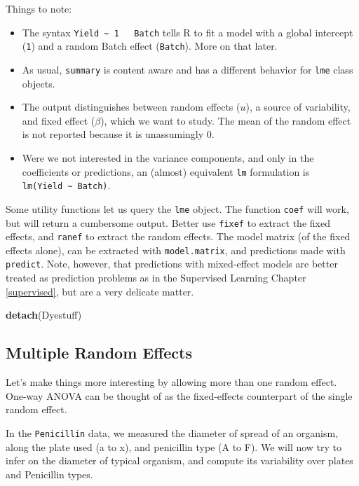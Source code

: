 \documentclass[]{book}
\newenvironment{Shaded}{\begin{snugshade}}{\end{snugshade}}
\newcommand{\KeywordTok}[1]{\textcolor[rgb]{0.13,0.29,0.53}{\textbf{#1}}}
\newcommand{\NormalTok}[1]{#1}
\providecommand{\tightlist}{%
  \setlength{\itemsep}{0pt}\setlength{\parskip}{0pt}}
\theoremstyle{definition}
\theoremstyle{definition}
\theoremstyle{definition}
\theoremstyle{remark}
\begin{document}
Things to note:

\begin{itemize}
\tightlist
\item
  The syntax \texttt{Yield\ \textasciitilde{}\ 1\ \ \textbar{}\ Batch} tells R to fit a model with a global intercept (\texttt{1}) and a random Batch effect (\texttt{\textbar{}Batch}). More on that later.
\item
  As usual, \texttt{summary} is content aware and has a different behavior for \texttt{lme} class objects.
\item
  The output distinguishes between random effects (\(u\)), a source of variability, and fixed effect (\(\beta\)), which we want to study. The mean of the random effect is not reported because it is unassumingly 0.
\item
  Were we not interested in the variance components, and only in the coefficients or predictions, an (almost) equivalent \texttt{lm} formulation is \texttt{lm(Yield\ \textasciitilde{}\ Batch)}.
\end{itemize}

Some utility functions let us query the \texttt{lme} object.
The function \texttt{coef} will work, but will return a cumbersome output. Better use \texttt{fixef} to extract the fixed effects, and \texttt{ranef} to extract the random effects.
The model matrix (of the fixed effects alone), can be extracted with \texttt{model.matrix}, and predictions made with \texttt{predict}.
Note, however, that predictions with mixed-effect models are better treated as prediction problems as in the Supervised Learning Chapter \ref{supervised}, but are a very delicate matter.

\begin{Shaded}
\begin{Highlighting}[]
\KeywordTok{detach}\NormalTok{(Dyestuff)}
\end{Highlighting}
\end{Shaded}

\hypertarget{multiple-random-effects}{%
\subsection{Multiple Random Effects}\label{multiple-random-effects}}

Let's make things more interesting by allowing more than one random effect.
One-way ANOVA can be thought of as the fixed-effects counterpart of the single random effect.

In the \texttt{Penicillin} data, we measured the diameter of spread of an organism, along the plate used (a to x), and penicillin type (A to F).
We will now try to infer on the diameter of typical organism, and compute its variability over plates and Penicillin types.
\end{document}
